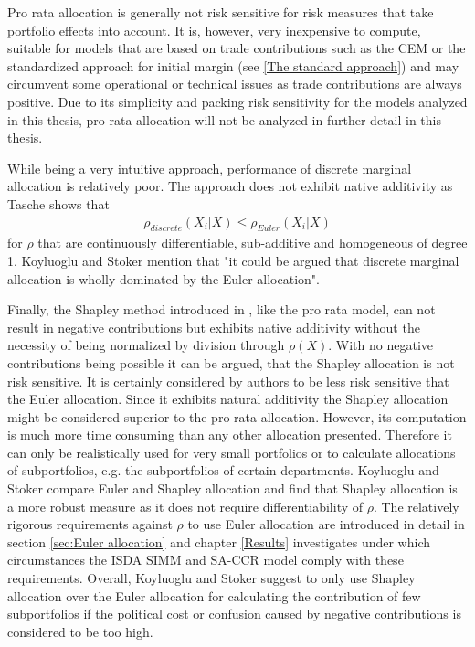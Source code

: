 \documentclass[../Thesis_AHoecherl.tex]{subfiles}
\begin{document}
Pro rata allocation is generally not risk sensitive for risk measures that take portfolio effects into account.
It is, however, very inexpensive to compute, suitable for models that are based on trade contributions such as the \gls{CEM} or the standardized approach for initial margin (see \ref{The standard approach}) and may circumvent some operational or technical issues as trade contributions are always positive.
Due to its simplicity and packing risk sensitivity for the models analyzed in this thesis, pro rata allocation will not be analyzed in further detail in this thesis.

While being a very intuitive approach, performance of discrete marginal allocation is relatively poor. The approach does not exhibit native additivity as Tasche \cite{tasche2007} shows that 
\begin{align*}
    \rho_{discrete}\left(X_i|X\right) \leq \rho_{Euler}\left(X_i|X\right)
\end{align*}
for $\rho$ that are continuously differentiable, sub-additive and homogeneous of degree 1. 
Koyluoglu and Stoker \cite{koyluoglu2002risk} mention that "it could be argued that discrete marginal allocation is wholly dominated by the Euler allocation".

Finally, the Shapley method introduced in \cite{shapley1951}, like the pro rata model, can not result in negative contributions but exhibits native additivity without the necessity of being normalized by division through $\rho(X)$.
With no negative contributions being possible it can be argued, that the Shapley allocation is not risk sensitive. It is certainly considered by authors to be less risk sensitive that the Euler allocation.
Since it exhibits natural additivity the Shapley allocation might be considered superior to the pro rata allocation. However, its computation is much more time consuming than any other allocation presented. 
Therefore it can only be realistically used for very small portfolios or to calculate allocations of subportfolios, e.g. the subportfolios of certain departments.
Koyluoglu and Stoker \cite{koyluoglu2002risk} compare Euler and Shapley allocation and find that Shapley allocation is a more robust measure as it does not require differentiability of $\rho$. The relatively rigorous requirements against $\rho$ to use Euler allocation are introduced in detail in section \ref{sec:Euler allocation} and chapter \ref{Results} investigates under which circumstances the ISDA SIMM and SA-CCR model comply with these requirements.
Overall, Koyluoglu and Stoker suggest to only use Shapley allocation over the Euler allocation for calculating the contribution of few subportfolios if the political cost or confusion caused by negative contributions is considered to be too high. 
\end{document}
